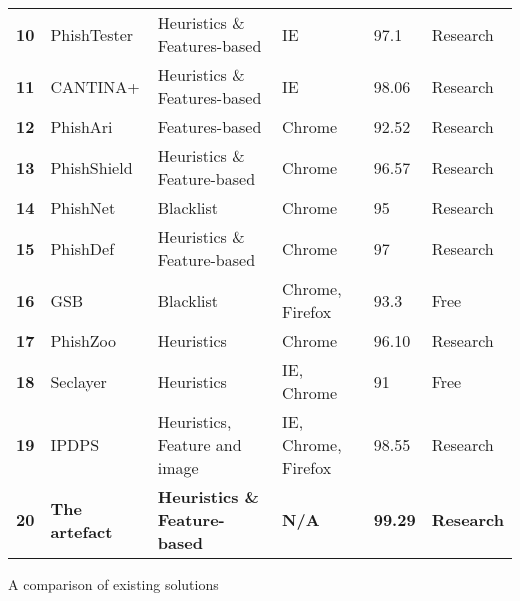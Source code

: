 \begin{center}
\begin{tabular}{  m{0.5em}  m{6em}  m{13.3em}  m{8.5em}  m{2.3em}  m{4.3em}  }
		\multicolumn{1}{r}{\textbf{10}} & PhishTester           & Heuristics \& Features-based         & IE                  & 97.1           & Research          \\

		\multicolumn{1}{r}{\textbf{11}} & CANTINA+              & Heuristics \& Features-based         & IE                  & 98.06          & Research          \\

		\multicolumn{1}{r}{\textbf{12}} & PhishAri              & Features-based                       & Chrome              & 92.52          & Research          \\

		\multicolumn{1}{r}{\textbf{13}} & PhishShield           & Heuristics \& Feature-based          & Chrome              & 96.57          & Research          \\

		\multicolumn{1}{r}{\textbf{14}} & PhishNet              & Blacklist                            & Chrome              & 95             & Research          \\

		\multicolumn{1}{r}{\textbf{15}} & PhishDef              & Heuristics \& Feature-based          & Chrome              & 97             & Research          \\

		\multicolumn{1}{r}{\textbf{16}} & GSB                   & Blacklist                            & Chrome, Firefox     & 93.3           & Free              \\

		\multicolumn{1}{r}{\textbf{17}} & PhishZoo              & Heuristics                           & Chrome              & 96.10          & Research          \\

		\multicolumn{1}{r}{\textbf{18}} & Seclayer              & Heuristics                           & IE, Chrome          & 91             & Free              \\

		\multicolumn{1}{r}{\textbf{19}} & IPDPS                 & Heuristics, Feature and image        & IE, Chrome, Firefox & 98.55          & Research          \\ \midrule

		\multicolumn{1}{r}{\textbf{20}} & \textbf{The artefact} & \textbf{Heuristics \& Feature-based} & \textbf{N/A}        & \textbf{99.29} & \textbf{Research} \\ \bottomrule
	\end{tabular}
	\captionsetup{type=table}\caption{A comparison of existing solutions \citep{Adebowale}}
	\label{tab:EXISTENT_SOLUTIONS_COMPARISON}
\end{center}

